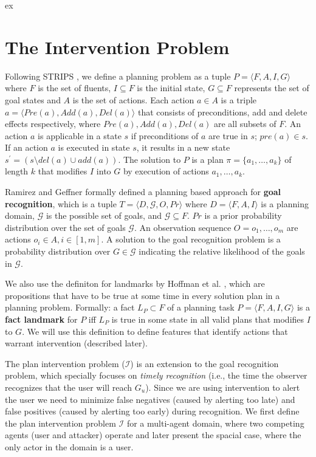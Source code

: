 ex\section{The Intervention Problem}
\label{sec:problemstatement}
Following STRIPS \cite{fikes1971strips}, we define a planning problem as a tuple $ P = \langle F, A, I, G \rangle$ where $F$ is the set of fluents, $I\subseteq F$ is the initial state, $G  \subseteq F$ represents the set of goal states and $A$ is the set of actions. Each action $a \in A$ is a triple $a=\langle Pre(a), Add(a), Del(a)\rangle$ that consists of preconditions, add and delete effects respectively, where $Pre(a), Add(a), Del(a)$ are all subsets of $F$. An action $a$ is applicable in a state $s$ if preconditions of $a$ are true in $s$; $pre(a) \in s$. If an action $a$ is executed in state $s$, it results in a new state $s^{\prime} = (s \setminus del(a) \cup add(a))$.  The solution to $P$ is a plan $\pi = \{a_1, \dots ,a_k\}$ of length $k$ that modifies $I$ into $G$ by execution of actions $a_1, \dots ,a_k$.  

Ramirez and Geffner  formally defined a planning based approach for \textbf{goal recognition}, which is a tuple $T= \langle D, \mathcal{G}, O, Pr \rangle$ where $D=\langle F, A, I \rangle$ is a planning domain, $\mathcal{G}$ is the possible set of goals, and $\mathcal{G} \subseteq F$. $Pr$ is a prior probability distribution over the set of goals $\mathcal{G}$. An observation sequence $O = o_1, \ldots , o_m$ are actions $o_i \in A, i \in[1,m]$. A solution to the goal recognition problem is a probability distribution over $G \in \mathcal{G}$ indicating the relative likelihood of the goals in $\mathcal{G}$.

We also use the definiton for landmarks by Hoffman et al. , which are propositions that have to be true at some time in every solution plan in a planning problem. Formally: a fact $L_P \subset F$ of a planning task $ P = \langle F, A, I, G \rangle$ is a \textbf{fact landmark} for $P$ iff $L_P$ is true in some state in all valid plans that modifies $I$ to $G$. We will use this definition to define features that identify actions that warrant intervention (described later).

The plan intervention problem ($\mathcal{I}$) is an extension to the goal recognition problem, which specially focuses on \textit{timely recognition} (i.e., the time the observer recognizes  that the user will reach $G_u$). Since we are using intervention to alert the user we need to minimize false negatives (caused by alerting too late) and false positives (caused by alerting too early) during recognition. We first define the plan intervention problem $\mathcal{I}$ for a multi-agent domain, where two competing agents (user and attacker) operate and later present the spacial case, where the only actor in the domain is a user.

